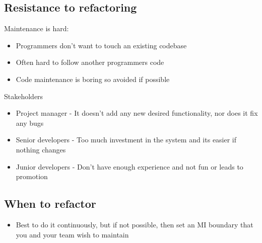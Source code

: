\documentclass{article}[18pt]
\begin{document}
\subsection{Resistance to refactoring}
Maintenance is hard:
\begin{itemize}
	\item Programmers don't want to touch an existing codebase
	\item Often hard to follow another programmers code
	\item Code maintenance is boring so avoided if possible
\end{itemize}
Stakeholders
\begin{itemize}
	\item Project manager - It doesn't add any new desired functionality, nor does it fix any bugs
	\item Senior developers - Too much investment in the system and its easier if nothing changes
	\item Junior developers - Don't have enough experience and not fun or leads to promotion
\end{itemize}
\subsection{When to refactor}
\begin{itemize}
	\item Best to do it continuously, but if not possible, then set an MI boundary that you and your team wish to maintain
\end{itemize}
\end{document}
